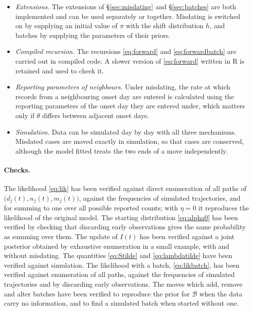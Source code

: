 \documentclass[11pt,a4paper]{article}
\begin{document}
\begin{itemize}[itemsep=2pt]
not available when downward revisions are allowed.
\item \emph{Extensions.} The extensions of \S\ref{sec:misdating} and
\S\ref{sec:batches} are both implemented and can be used separately or
together. Misdating is switched on by supplying an initial value of $\pi$ with
the shift distribution $h$, and batches by supplying the parameters of their
priors.
\item \emph{Compiled recursion.} The recursions \eqref{eq:forward} and
\eqref{eq:forwardbatch} are carried out in compiled code. A slower version of
\eqref{eq:forward} written in R is retained and used to check it.
\item \emph{Reporting parameters of neighbours.} Under misdating, the rate at
which records from a neighbouring onset day are entered is calculated using
the reporting parameters of the onset day they are entered under, which
matters only if $\theta$ differs between adjacent onset days.
\item \emph{Simulation.} Data can be simulated day by day with all three
mechanisms. Misdated cases are moved exactly in simulation, so that cases are
conserved, although the model fitted treats the two ends of a move
independently.
\end{itemize}

\paragraph{Checks.} The likelihood \eqref{eq:lik} has been verified against
direct enumeration of all paths of $\bigl(d_j(t),n_j(t),m_j(t)\bigr)$, against
the frequencies of simulated trajectories, and for summing to one over all
possible reported counts; with $\eta=0$ it reproduces the likelihood of the
original model. The starting distribution \eqref{eq:alpha0} has been verified
by checking that discarding early observations gives the same probability as
summing over them. The update of $I(t)$ has been verified against a joint
posterior obtained by exhaustive enumeration in a small example, with and
without misdating. The quantities \eqref{eq:Stilde} and \eqref{eq:lambdatilde}
have been verified against simulation. The likelihood with a batch,
\eqref{eq:likbatch}, has been verified against enumeration of all paths,
against the frequencies of simulated trajectories and by discarding early
observations. The moves which add, remove and alter batches have been verified
to reproduce the prior for $\mathcal{B}$ when the data carry no information,
and to find a simulated batch when started without one.
\end{document}
